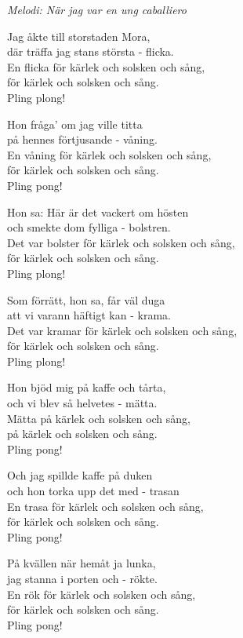 {\footnotesize\textit{Melodi: När jag var en ung caballiero}}\par
\vspace{10pt}
Jag åkte till storstaden Mora,\\
där träffa jag stans största - flicka.\\
En flicka för kärlek och solsken och sång,\\
för kärlek och solsken och sång.\\
Pling plong!\par
\vspace{10pt}
Hon fråga' om jag ville titta\\
på hennes förtjusande - våning.\\
En våning för kärlek och solsken och sång,\\
för kärlek och solsken och sång.\\
Pling pong!\par
\vspace{10pt}
Hon sa: Här är det vackert om hösten\\
och smekte dom fylliga - bolstren.\\
Det var bolster för kärlek och solsken och sång,\\
för kärlek och solsken och sång.\\
Pling plong!\par
\vspace{10pt}
Som förrätt, hon sa, får väl duga\\
att vi varann häftigt kan - krama.\\
Det var kramar för kärlek och solsken och sång,\\
för kärlek och solsken och sång.\\
Pling plong!\par
\vspace{10pt}
Hon bjöd mig på kaffe och tårta,\\
och vi blev så helvetes - mätta.\\
Mätta på kärlek och solsken och sång,\\
på kärlek och solsken och sång.\\
Pling pong!\par
\vspace{10pt}
Och jag spillde kaffe på duken\\
och hon torka upp det med - trasan\\
En trasa för kärlek och solsken och sång,\\
för kärlek och solsken och sång.\\
Pling pong!\par
\vspace{10pt}
På kvällen när hemåt ja lunka,\\
jag stanna i porten och - rökte.\\
En rök för kärlek och solsken och sång,\\
för kärlek och solsken och sång.\\
Pling pong!
